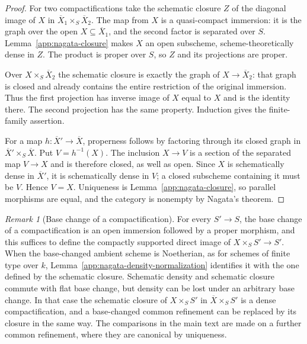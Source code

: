 \documentclass[11pt,a4paper]{article}
\numberwithin{equation}{section}
\theoremstyle{definition}
\theoremstyle{remark}
\newtheorem{remark}[theorem]{Remark}
\begin{document}
\begin{proof}
For two compactifications take the schematic closure $Z$ of the
diagonal image of $X$ in $\overline X_1\times_S\overline X_2$.
The map from $X$ is a quasi-compact immersion: it is the graph over
the open $X\subseteq\overline X_1$, and the second factor is
separated over $S$. Lemma~\ref{app:nagata-closure} makes $X$ an open
subscheme, scheme-theoretically dense in $Z$. The product is proper
over $S$, so $Z$ and its projections are proper.

Over $X\times_S\overline X_2$ the schematic closure is exactly the
graph of $X\to\overline X_2$: that graph is closed and already contains
the entire restriction of the original immersion. Thus the first
projection has inverse image of $X$ equal to $X$ and is the identity
there. The second projection has the same property. Induction gives
the finite-family assertion.

For a map $h:\overline X'\to\overline X$, properness follows by
factoring through its closed graph in
$\overline X'\times_S\overline X$. Put $V=h^{-1}(X)$. The inclusion
$X\to V$ is a section of the separated map $V\to X$ and is therefore
closed, as well as open. Since $X$ is schematically dense in
$\overline X'$, it is schematically dense in $V$; a closed subscheme
containing it must be $V$. Hence $V=X$. Uniqueness is
Lemma~\ref{app:nagata-closure}, so parallel morphisms are equal, and
the category is nonempty by Nagata's theorem.
\end{proof}

\begin{remark}[Base change of a compactification]
\label{app:nagata-base-change}
For every $S'\to S$, the base change of a compactification is an open
immersion followed by a proper morphism, and this suffices to define
the compactly supported direct image of $X\times_SS'\to S'$. When the
base-changed ambient scheme is Noetherian, as for schemes of finite
type over $k$, Lemma~\ref{app:nagata-density-normalization} identifies
it with the one defined by the schematic closure. Schematic density
and schematic closure commute with flat base change, but density can
be lost under an arbitrary base change. In that case the schematic
closure of $X\times_SS'$ in $\overline X\times_SS'$ is a dense
compactification, and a base-changed common refinement can be replaced
by its closure in the same way. The comparisons in the main text are
made on a further common refinement, where they are canonical by
uniqueness.
\end{remark}
\end{document}
